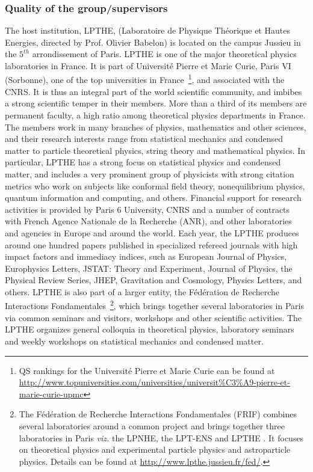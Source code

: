 \documentclass[a4paper,11pt]{article}
\begin{document}
\subsubsection{Quality of the group/supervisors}
\label{sec:gropu_quality}
 {
The host institution, LPTHE, (Laboratoire de Physique Th\'eorique et Hautes Energies, directed by Prof. Olivier Babelon) is located on the campus Jussieu in the $5^{th}$ arrondissement of Paris. LPTHE is one of the major theoretical physics laboratories in France. It is part of Universit\'e Pierre et Marie Curie, Paris VI (Sorbonne), one of the top universities in France~\footnote{QS rankings for the Universit\'e Pierre et Marie Curie can be found at \url{http://www.topuniversities.com/universities/universit\%C3\%A9-pierre-et-marie-curie-upmc}
}, and associated with the CNRS. It is thus an integral part of the world scientific community, and imbibes a strong scientific temper in their members. More than a third of its members are permanent faculty, a high ratio among theoretical physics departments in France. The members work in many branches of physics, mathematics and other sciences, and their research interests range from  statistical mechanics and condensed matter to particle theoretical physics, string theory and mathematical physics. In particular, LPTHE has a strong focus on statistical physics and condensed matter, and includes a very prominent group of 
physicists with strong citation metrics who work on subjects like conformal field theory, nonequilibrium physics, quantum information and computing, and others. Financial support for research activities is provided by Paris 6 University, CNRS and a number of contracts with  French Agence Nationale de la Recherche (ANR), and other laboratories and agencies in Europe and around the world.  Each year, the LPTHE produces around one hundred papers published in specialized refereed journals with high impact factors and immediacy indices, such as European Journal of Physics, Europhysics Letters, JSTAT: Theory and Experiment, Journal of Physics, the Physical Review Series, JHEP, Gravitation and Cosmology, Physics Letters, and others.  LPTHE is also part of a larger entity, the F\'ed\'eration de Recherche Interactions Fondamentales~\footnote{The F\'ed\'eration de Recherche Interactions Fondamentales (FRIF) combines several laboratories around a common project and brings together three laboratories in Paris \textit{
viz.} the LPNHE, the LPT-ENS and LPTHE . It focuses on theoretical physics and experimental particle physics and astroparticle physics. Details can be found at \url{http://www.lpthe.jussieu.fr/fed/}.}, which brings together several laboratories in Paris via common seminars and visitors, workshops and other scientific activities. The LPTHE organizes general colloquia in 
theoretical physics, laboratory seminars and weekly workshops on statistical mechanics and condensed matter.}
\end{document}
